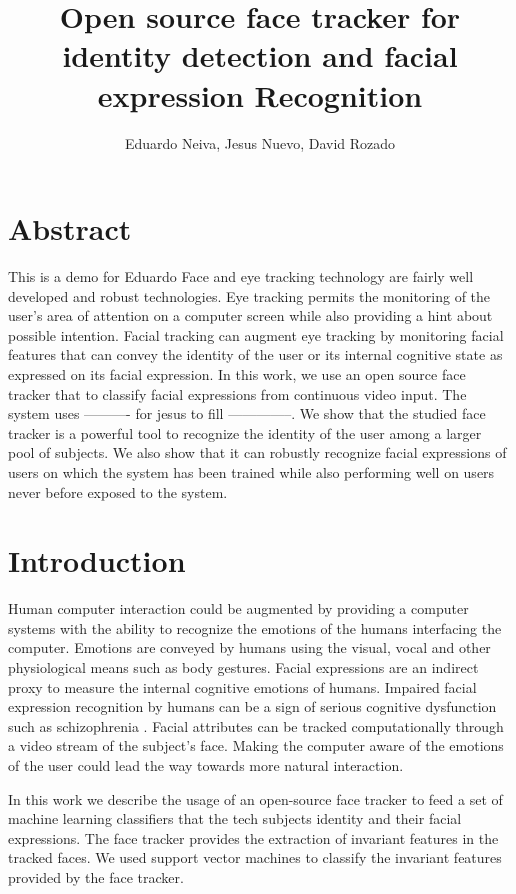 \documentclass[]{article}
\title{Open source face tracker for identity detection and facial expression Recognition}
\author{Eduardo Neiva, Jesus Nuevo, David Rozado}
\begin{document}
\maketitle

\section{Abstract}
This is a demo for Eduardo
Face and eye tracking technology are fairly well developed and robust technologies. Eye tracking permits the monitoring 
of the user's area of attention on a computer screen while also providing a hint about possible intention.
Facial tracking can augment eye tracking by monitoring facial features that can convey the identity of the user or its
internal cognitive state as expressed on its facial expression. In this work, we use an open source face tracker that to
classify facial expressions from continuous video input. The system uses ---------- for jesus to fill --------------. We
show that the studied face tracker is a powerful tool to recognize the identity of the user among a larger pool of
subjects. We also show  that it can robustly recognize facial expressions of users on which the system has been trained
while also performing well on users never before exposed to the system.


\section{Introduction}
Human computer interaction could be augmented by providing a computer systems with the ability to recognize the emotions
of the humans interfacing the computer. Emotions are conveyed by humans  using the visual, vocal and other physiological
means such as body gestures. Facial expressions are an indirect proxy to measure the internal cognitive emotions of
humans. Impaired facial expression recognition by humans can be a sign of serious cognitive dysfunction such as
schizophrenia \cite{Edwards2002789}.  Facial attributes can be tracked computationally through a video stream of the
subject's face. Making the computer aware of the emotions of the user could lead the way towards more natural interaction.


In this work we describe the usage of an open-source face tracker to feed a set of machine learning classifiers that the
tech subjects identity and their facial expressions. The face tracker provides the extraction of invariant features in
the tracked faces. We used support vector machines  to classify the invariant features provided by the face tracker.
\end{document}
